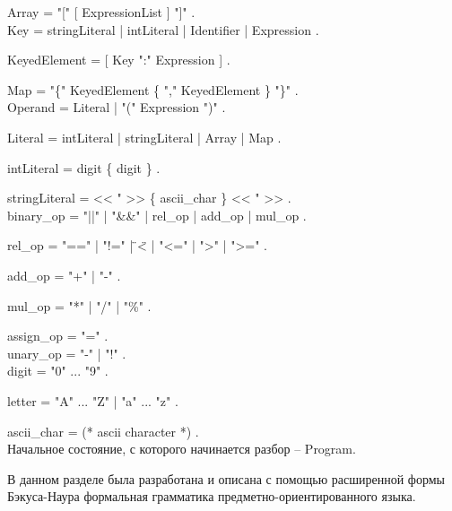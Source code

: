 Array = "{}["{} [ ExpressionList ] "{}]"{} . \\

Key = stringLiteral | intLiteral | Identifier | Expression .

KeyedElement  = [ Key "{}:"{} Expression ] .

Map = "{}\{"{} KeyedElement \{ "{},"{} KeyedElement \} "{}\}"{} . \\

Operand = Literal | "{}("{} Expression "{})"{} .

Literal = intLiteral | stringLiteral | Array | Map .

intLiteral = digit \{ digit \} .

stringLiteral = << "{} >> \{ ascii\_char \} << "{} >> . \\

binary\_op = "{}||"{} | "{}\&\&"{} | rel\_op | add\_op | mul\_op .

rel\_op = "{}=="{} | "{}!="{} | \"{}<\"{} | "{}<="{} | "{}>"{} | "{}>="{} .

add\_op = "{}+"{} | "{}-"{} .

mul\_op = "{}*"{} | "{}/"{} | "{}\%"{} .

assign\_op = "{}="{} . \\

unary\_op = "{}-"{} | "{}!"{} . \\

digit = "{}0"{} ... "{}9"{} .

letter = "{}A"{} ... "{}Z"{} | "{}a"{} ... "{}z"{} .

ascii\_char = (* ascii character *) . \\

Начальное состояние, с которого начинается разбор -- Program.

В данном разделе была разработана и описана с помощью расширенной формы Бэкуса-Наура формальная грамматика предметно-ориентированного языка.